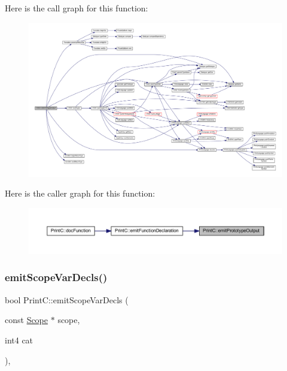 Here is the call graph for this function\+:
\nopagebreak
\begin{figure}[H]
\begin{center}
\leavevmode
\includegraphics[width=350pt]{class_print_c_a037bdd9a25c0bb21308609afde6452d3_cgraph}
\end{center}
\end{figure}
Here is the caller graph for this function\+:
\nopagebreak
\begin{figure}[H]
\begin{center}
\leavevmode
\includegraphics[width=350pt]{class_print_c_a037bdd9a25c0bb21308609afde6452d3_icgraph}
\end{center}
\end{figure}
\mbox{\label{class_print_c_af3fcfeca02664799789cf4042956ee26}} 
\subsubsection{\texorpdfstring{emitScopeVarDecls()}{emitScopeVarDecls()}}
{\footnotesize\ttfamily bool Print\+C\+::emit\+Scope\+Var\+Decls (\begin{DoxyParamCaption}\item[{const \mbox{\hyperlink{class_scope}{Scope}} $\ast$}]{scope,  }\item[{int4}]{cat }\end{DoxyParamCaption})\hspace{0.3cm}{\ttfamily [protected]}, {\ttfamily [virtual]}}



